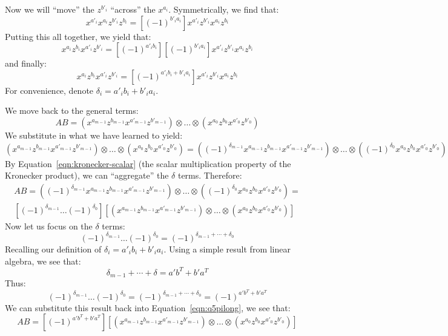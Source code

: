 \documentclass[letterpaper]{article}
\begin{document}
Now we will ``move'' the $ z^{b'_i} $ ``across'' the $ x^{a_i} $.
Symmetrically, we find that:
\[
x^{a'_i} x^{a_i} z^{b'_i} z^{b_i} = \left[{(-1)}^{b'_i a_i}\right] x^{a'_i} z^{b'_i} x^{a_i} z^{b_i}
\]
Putting this all together, we yield that:
\[
x^{a_i} z^{b_i} x^{a'_i} z^{b'_i} = \left[{(-1)}^{a'_i b_i} \right] \left[{(-1)}^{b'_i a_i}\right] x^{a'_i} z^{b'_i} x^{a_i} z^{b_i}
\]
and finally:
\[
x^{a_i} z^{b_i} x^{a'_i} z^{b'_i} = \left[{(-1)}^{a'_i b_i + b'_i a_i} \right] x^{a'_i} z^{b'_i} x^{a_i} z^{b_i}
\]
For convenience, denote $ \delta_i = a'_i b_i + b'_i a_i $.

We move back to the general terms:
\[
AB = (x^{a_{m - 1}} z^{b_{m - 1}} x^{a'_{m - 1}} z^{b'_{m - 1}}) \otimes \ldots \otimes (x^{a_{0}} z^{b_{0}} x^{a'_{0}} z^{b'_{0}})
\]
We substitute in what we have learned to yield:
\[
(x^{a_{m - 1}} z^{b_{m - 1}} x^{a'_{m - 1}} z^{b'_{m - 1}}) \otimes \ldots \otimes (x^{a_{0}} z^{b_{0}} x^{a'_{0}} z^{b'_{0}}) = ({(-1)}^{\delta_{m - 1}} x^{a_{m - 1}} z^{b_{m - 1}} x^{a'_{m - 1}} z^{b'_{m - 1}}) \otimes \ldots \otimes ({(-1)}^{\delta_{0}} x^{a_{0}} z^{b_{0}} x^{a'_{0}} z^{b'_{0}})
\]
By Equation~\ref{eqn:kronecker-scalar} (the scalar multiplication property of the Kronecker product), we can ``aggregate'' the $ \delta $ terms.
Therefore:
\begin{multline}
\label{eqn:q5pilong}
 AB = ({(-1)}^{\delta_{m - 1}} x^{a_{m - 1}} z^{b_{m - 1}} x^{a'_{m - 1}} z^{b'_{m - 1}}) \otimes \ldots \otimes ({(-1)}^{\delta_{0}} x^{a_{0}} z^{b_{0}} x^{a'_{0}} z^{b'_{0}})
 = \\
  \left[{(-1)}^{\delta_{m-1}} \ldots {(-1)}^{\delta_{0}}\right] \left[(x^{a_{m - 1}} z^{b_{m - 1}} x^{a'_{m - 1}} z^{b'_{m - 1}}) \otimes \ldots \otimes (x^{a_{0}} z^{b_{0}} x^{a'_{0}} z^{b'_{0}}) \right]
\end{multline}
Now let us focus on the $ \delta $ terms:
\[
{(-1)}^{\delta_{m-1}} \ldots {(-1)}^{\delta_{0}}
=
{(-1)}^{\delta_{m-1} + \cdots + \delta_{0}}
\]
Recalling our definition of $ \delta_i = a'_i b_i + b'_i a_i $.
Using a simple result from linear algebra, we see that:
$$ \delta_{m - 1} + \cdots + \delta = a'b^T + b'a^T $$
Thus:
\[
{(-1)}^{\delta_{m-1}} \ldots {(-1)}^{\delta_{0}}
=
{(-1)}^{\delta_{m-1} + \cdots + \delta_{0}}
=
{(-1)}^{a'b^T + b'a^T}
\]
We can substitute this result back into Equation~\ref{eqn:q5pilong}, we see that:
\[
AB = \left[{(-1)}^{a'b^T + b'a^T}\right]\left[(x^{a_{m - 1}} z^{b_{m - 1}} x^{a'_{m - 1}} z^{b'_{m - 1}}) \otimes \ldots \otimes (x^{a_{0}} z^{b_{0}} x^{a'_{0}} z^{b'_{0}}) \right]
\]
\end{document}
